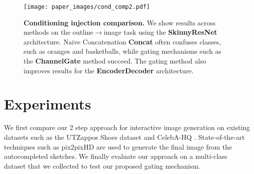 \begin{figure*}[t]
	\centering
	\texttt{[image: paper\_images/cond\_comp2.pdf]}
	\caption{{\bf Conditioning injection comparison.} We show results across methods on the outline$\rightarrow$image task using the \textbf{SkinnyResNet} architecture. Naive Concatenation \textbf{Concat} often confuses classes, such as oranges and basketballs, while gating mechanisms such as the \textbf{ChannelGate} method succeed. The gating method also improves results for the \textbf{EncoderDecoder} architecture. \label{fig:alg_comp} }
	\vspace{-4mm}
\end{figure*}

\vspace{-4mm}
\section{Experiments}
\label{sec:experiments}
We first compare our 2 step approach for interactive image generation on existing datasets such as the UTZappos Shoes dataset \cite{yu2014fine} and CelebA-HQ \cite{karras2017progressive}. State-of-the-art techniques such as pix2pixHD \cite{Wang_2018_CVPR} are used to generate the final image from the autocompleted sketches. We finally evaluate our approach on a multi-class dataset that we collected to test our proposed gating mechanism.


